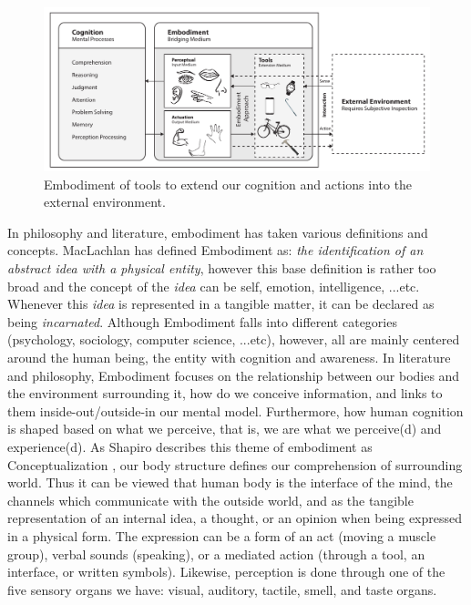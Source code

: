 \begin{figure}[t!]
  \centering
    \centerline{\includegraphics[width=1.3\linewidth]{figures/intro/Embodied-Cognition.pdf}}
  \captionsetup{justification=centering}
  \caption{Embodiment of tools to extend our cognition and actions into the external environment.}
  \label{fig:intro-embodiment}
\end{figure}

In philosophy and literature, embodiment has taken various definitions and concepts. MacLachlan \cite{maclachlan2004embodiment} has defined Embodiment as: \textit{the identification of an abstract idea with a physical entity}, however this base definition is rather too broad and the concept of the \textit{idea} can be self, emotion, intelligence, ...etc. Whenever this \textit{idea} is represented in a tangible matter, it can be declared as being \textit{incarnated}. Although Embodiment falls into different categories (psychology, sociology, computer science, ...etc), however, all are mainly centered around the human being, the entity with cognition and awareness. In literature and philosophy, Embodiment focuses on the relationship between our bodies and the environment surrounding it, how do we conceive information, and links to them inside-out/outside-in our mental model. Furthermore, how human cognition is shaped based on what we perceive, that is, we are what we perceive(d) and experience(d). As Shapiro describes this theme of embodiment as Conceptualization \cite{shapiro2010embodied}, our body structure defines our comprehension of surrounding world. Thus it can be viewed that human body is the interface of the mind, the channels which communicate with the outside world, and as the tangible representation of an internal idea, a thought, or an opinion when being expressed in a physical form. The expression can be a form of an act (moving a muscle group), verbal sounds (speaking), or a mediated action (through a tool, an interface, or written symbols). Likewise, perception is done through one of the five sensory organs we have: visual, auditory, tactile, smell, and taste organs. 


